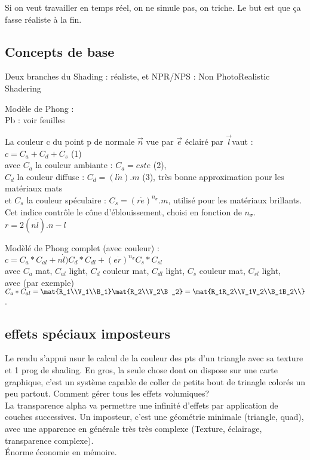 \documentclass[11pt]{article}
\begin{document}
{Si on veut travailler en temps réel, on ne simule pas, on triche. Le but est que ça fasse réaliste à la fin.

\subsection{Concepts de base}
Deux branches du Shading : réaliste, et NPR/NPS : Non PhotoRealistic Shadering

Modèle de Phong :\\
Pb : voir feuilles

La couleur c du point p de normale $\overrightarrow{n}$ vue par $\overrightarrow{e}$ éclairé par $\overrightarrow{l}$vaut :\\
$ c = C_a + C_d + C_s $ (1)\\
avec $C_a$ la couleur ambiante : $ C_a = cste$ (2),\\
$C_d$ la couleur diffuse : $ C_d = (l\dot n) . m$ (3), très bonne approximation pour les matériaux mats\\
et $C_s$ la couleur spéculaire : $C_s = (r \dot e)^{n_\sigma} . m$, utilisé pour les matériaux brillants. Cet indice contrôle le cône d'éblouissement, choisi en fonction de $n_\sigma$. $r = 2(n\dot l). n - l$

Modèlé de Phong complet (avec couleur) :\\
$c = C_a * C_{al} + n\dot l) C_d * C_{dl} + (e\dot r)^{n_\sigma} C_s * C_{sl}$\\
avec $C_a$ mat, $C_{al}$ light, $C_d$ couleur mat, $C_{dl}$ light, $C_s$ couleur mat, $C_{sl}$ light, \\
avec (par exemple) $C_a * C_{al} = \mat{R_1\\V_1\\B_1}\mat{R_2\\V_2\B_2} = \mat{R_1R_2\\V_1V_2\\B_1B_2\\}$.\\

\vskip 1cm
\subsection{effets spéciaux imposteurs}
Le rendu s'appui nsur le calcul de la couleur des pts d'un triangle avec sa texture et 1 prog de shading. En gros, la seule chose dont on dispose sur une carte graphique, c'est un système capable de coller de petits bout de trinagle colorés un peu partout. Comment gérer tous les effets volumiques? \\
La transparence alpha va permettre une infinité d'effets par application de couches successives. Un imposteur, c'est une géométrie minimale (triangle, quad), avec une apparence en générale très très complexe (Texture, éclairage, transparence complexe).\\
Énorme économie en mémoire.

}
\end{document}
